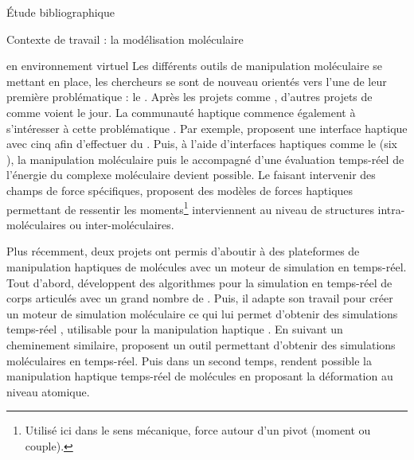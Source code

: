 \documentclass[myfrancais,ngerman,english,frenchb]{mythesis}
\begin{document}
\begin{mychapter}{Étude bibliographique}
\begin{mysection}{Contexte de travail : la modélisation moléculaire}
\begin{mysubsection}{ en environnement virtuel}
				Les différents outils de manipulation moléculaire se mettant en place, les chercheurs se sont de nouveau orientés vers l'une de leur première problématique : le .
				Après les projets comme \myGROPE, d'autres projets de  comme \mySTALK {} voient le jour.
				La communauté haptique commence également à s'intéresser à cette problématique .
				Par exemple,  proposent une interface haptique avec cinq   afin d'effectuer du  .
				Puis, à l'aide d'interfaces haptiques comme le \myVirtuose (six ), la manipulation moléculaire  puis le   accompagné d'une évaluation temps-réel de l'énergie du complexe moléculaire devient possible.
				Le  faisant intervenir des champs de force spécifiques,  proposent des modèles de forces haptiques permettant de ressentir les moments\footnote{Utilisé ici dans le sens mécanique, force autour d'un pivot (moment ou couple).} interviennent au niveau de structures intra-moléculaires ou inter-moléculaires.

				Plus récemment, deux projets ont permis d'aboutir à des plateformes de manipulation haptiques de molécules avec un moteur de simulation en temps-réel.
				Tout d'abord,  développent des algorithmes pour la simulation en temps-réel de corps articulés avec un grand nombre de .
				Puis, il adapte son travail pour créer un moteur de simulation moléculaire ce qui lui permet d'obtenir des simulations temps-réel , utilisable pour la manipulation haptique .
				En suivant un cheminement similaire,  proposent un outil permettant d'obtenir des simulations moléculaires en temps-réel.
				Puis dans un second temps,  rendent possible la manipulation haptique temps-réel de molécules en proposant la déformation au niveau atomique.

				\begin{myfigure}
				\end{myfigure}


\end{mysubsection}
\end{mysection}
\end{mychapter}
\end{document}
